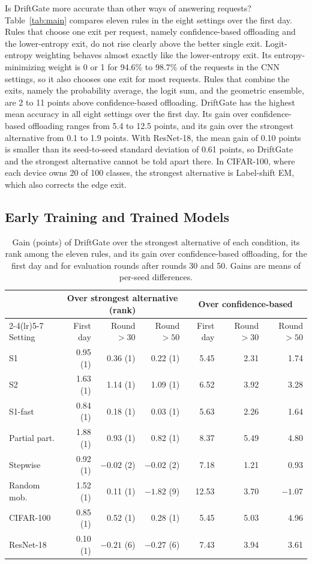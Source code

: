 Is DriftGate more accurate than other ways of answering requests? Table~\ref{tab:main} compares eleven rules in the eight settings over the first day. Rules that choose one exit per request, namely confidence-based offloading and the lower-entropy exit, do not rise clearly above the better single exit. Logit-entropy weighting behaves almost exactly like the lower-entropy exit. Its entropy-minimizing weight is 0 or 1 for 94.6\% to 98.7\% of the requests in the CNN settings, so it also chooses one exit for most requests. Rules that combine the exits, namely the probability average, the logit sum, and the geometric ensemble, are 2 to 11 points above confidence-based offloading. DriftGate has the highest mean accuracy in all eight settings over the first day. Its gain over confidence-based offloading ranges from 5.4 to 12.5 points, and its gain over the strongest alternative from 0.1 to 1.9 points. With ResNet-18, the mean gain of 0.10 points is smaller than its seed-to-seed standard deviation of 0.61 points, so DriftGate and the strongest alternative cannot be told apart there. In CIFAR-100, where each device owns 20 of 100 classes, the strongest alternative is Label-shift EM, which also corrects the edge exit.

\subsection{Early Training and Trained Models}
\label{sec:trained}

\begin{table}[t]
\centering
\caption{Gain (points) of DriftGate over the strongest alternative of each condition, its rank among the eleven rules, and its gain over confidence-based offloading, for the first day and for evaluation rounds after rounds 30 and 50. Gains are means of per-seed differences.}
\label{tab:windows}
\footnotesize
\begin{tabular}{lrrrrrr}
\toprule
 & \multicolumn{3}{c}{Over strongest alternative (rank)} & \multicolumn{3}{c}{Over confidence-based} \\
\cmidrule(lr){2-4}\cmidrule(lr){5-7}
Setting & First day & Round $>30$ & Round $>50$ & First day & Round $>30$ & Round $>50$ \\
\midrule
S1 & 0.95 (1) & 0.36 (1) & 0.22 (1) & 5.45 & 2.31 & 1.74 \\
S2 & 1.63 (1) & 1.14 (1) & 1.09 (1) & 6.52 & 3.92 & 3.28 \\
S1-fast & 0.84 (1) & 0.18 (1) & 0.03 (1) & 5.63 & 2.26 & 1.64 \\
Partial part. & 1.88 (1) & 0.93 (1) & 0.82 (1) & 8.37 & 5.49 & 4.80 \\
Stepwise & 0.92 (1) & $-0.02$ (2) & $-0.02$ (2) & 7.18 & 1.21 & 0.93 \\
Random mob. & 1.52 (1) & 0.11 (1) & $-1.82$ (9) & 12.53 & 3.70 & $-1.07$ \\
CIFAR-100 & 0.85 (1) & 0.52 (1) & 0.28 (1) & 5.45 & 5.03 & 4.96 \\
ResNet-18 & 0.10 (1) & $-0.21$ (6) & $-0.27$ (6) & 7.43 & 3.94 & 3.61 \\
\bottomrule
\end{tabular}
\end{table}

